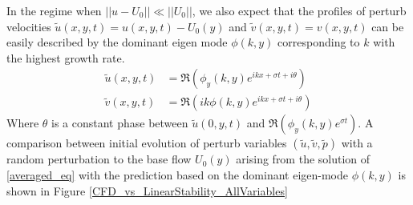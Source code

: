\documentclass[12pt]{report}   %
\begin{document}
In the regime when $||u-U_0|| \ll ||U_0||$, we also expect that the profiles of perturb velocities $\tilde{u}(x,y,t) = u(x,y,t) - U_0(y)$ and $\tilde{v}(x,y,t) = v(x,y,t)$ can be easily described by the dominant eigen mode $\phi(k,y)$ corresponding to $k$ with the highest growth rate.
\begin{equation}
\begin{split}
 \tilde{u}(x,y,t) &= \Re\left(\phi_y(k,y) e^{ikx+\sigma t+ i\theta}\right)\\
 \tilde{v}(x,y,t) &= \Re\left(ik \phi(k,y) e^{ikx+\sigma t + i\theta }\right)
\end{split}
\end{equation}
Where $\theta$ is a constant phase between $\tilde{u}(0,y,t)$ and $\Re(\phi_y(k,y) e^{\sigma t})$. A comparison between initial evolution of perturb variables $(\tilde{u}, \tilde{v}, \tilde{p})$ with a random perturbation to the base flow $U_0(y)$ arising from the solution of \eqref{averaged_eq} with the prediction based  on the dominant eigen-mode $\phi(k,y)$ is shown in Figure \ref{CFD_vs_LinearStability_AllVariables}
\end{document}
